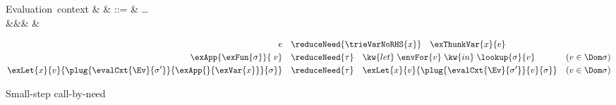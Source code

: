 \begin{figure}[H]
\begingroup
\renewcommand*{\arraystretch}{1.2}
\begin{syntaxfig}
\mbox{Evaluation context}
&
\evalCxt{\Ev}{\sigma}
&
::=
&
\ldots
\\
&&&
&
\end{syntaxfig}
\endgroup

\noindent {}
{\small
\begin{align*}
e
&
\quad \reduceNeed{\trieVarNoRHS{x}} \quad
\exThunkVar{x}{e}
\\
\exApp{\exFun{\sigma}}{\;v}
&
\quad \reduceNeed{\tau} \quad
\kw{let}\;{\envFor{v}}\;\kw{in}\;{\lookup{\sigma}{v}}
&
(v \in \Dom \sigma)
\\
\exLet{x}{v}{\plug{\evalCxt{\Ev}{\sigma'}}{\exApp{}{\exVar{x}}}{\sigma}}
&
\quad \reduceNeed{\tau} \quad
\exLet{x}{v}{\plug{\evalCxt{\Ev}{\sigma'}}{v}{\sigma}}
&
(v \in \Dom \sigma)
\end{align*}
}
\caption{Small-step call-by-need}
\label{fig:reduce:call-by-need}
\end{figure}
